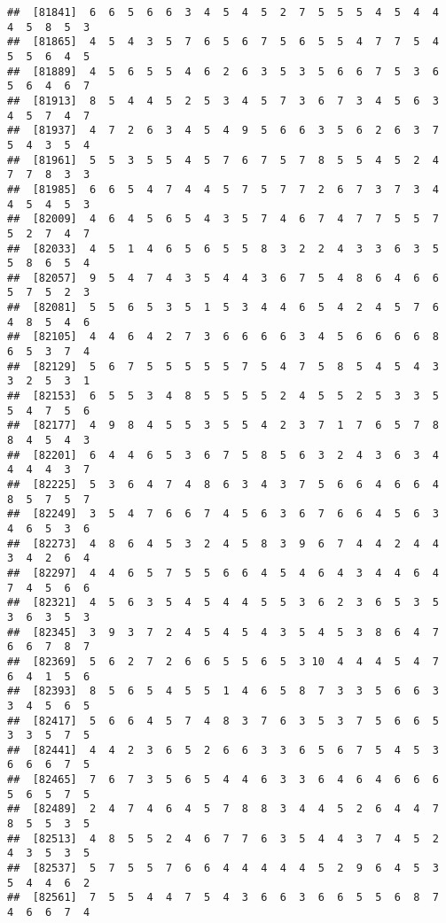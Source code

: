 \documentclass[
]{book}
\begin{document}
\begin{verbatim}
##  [81841]  6  6  5  6  6  3  4  5  4  5  2  7  5  5  5  4  5  4  4  4  5  8  5  3
##  [81865]  4  5  4  3  5  7  6  5  6  7  5  6  5  5  4  7  7  5  4  5  5  6  4  5
##  [81889]  4  5  6  5  5  4  6  2  6  3  5  3  5  6  6  7  5  3  6  5  6  4  6  7
##  [81913]  8  5  4  4  5  2  5  3  4  5  7  3  6  7  3  4  5  6  3  4  5  7  4  7
##  [81937]  4  7  2  6  3  4  5  4  9  5  6  6  3  5  6  2  6  3  7  5  4  3  5  4
##  [81961]  5  5  3  5  5  4  5  7  6  7  5  7  8  5  5  4  5  2  4  7  7  8  3  3
##  [81985]  6  6  5  4  7  4  4  5  7  5  7  7  2  6  7  3  7  3  4  4  5  4  5  3
##  [82009]  4  6  4  5  6  5  4  3  5  7  4  6  7  4  7  7  5  5  7  5  2  7  4  7
##  [82033]  4  5  1  4  6  5  6  5  5  8  3  2  2  4  3  3  6  3  5  5  8  6  5  4
##  [82057]  9  5  4  7  4  3  5  4  4  3  6  7  5  4  8  6  4  6  6  5  7  5  2  3
##  [82081]  5  5  6  5  3  5  1  5  3  4  4  6  5  4  2  4  5  7  6  4  8  5  4  6
##  [82105]  4  4  6  4  2  7  3  6  6  6  6  3  4  5  6  6  6  6  8  6  5  3  7  4
##  [82129]  5  6  7  5  5  5  5  5  7  5  4  7  5  8  5  4  5  4  3  3  2  5  3  1
##  [82153]  6  5  5  3  4  8  5  5  5  5  2  4  5  5  2  5  3  3  5  5  4  7  5  6
##  [82177]  4  9  8  4  5  5  3  5  5  4  2  3  7  1  7  6  5  7  8  8  4  5  4  3
##  [82201]  6  4  4  6  5  3  6  7  5  8  5  6  3  2  4  3  6  3  4  4  4  4  3  7
##  [82225]  5  3  6  4  7  4  8  6  3  4  3  7  5  6  6  4  6  6  4  8  5  7  5  7
##  [82249]  3  5  4  7  6  6  7  4  5  6  3  6  7  6  6  4  5  6  3  4  6  5  3  6
##  [82273]  4  8  6  4  5  3  2  4  5  8  3  9  6  7  4  4  2  4  4  3  4  2  6  4
##  [82297]  4  4  6  5  7  5  5  6  6  4  5  4  6  4  3  4  4  6  4  7  4  5  6  6
##  [82321]  4  5  6  3  5  4  5  4  4  5  5  3  6  2  3  6  5  3  5  3  6  3  5  3
##  [82345]  3  9  3  7  2  4  5  4  5  4  3  5  4  5  3  8  6  4  7  6  6  7  8  7
##  [82369]  5  6  2  7  2  6  6  5  5  6  5  3 10  4  4  4  5  4  7  6  4  1  5  6
##  [82393]  8  5  6  5  4  5  5  1  4  6  5  8  7  3  3  5  6  6  3  3  4  5  6  5
##  [82417]  5  6  6  4  5  7  4  8  3  7  6  3  5  3  7  5  6  6  5  3  3  5  7  5
##  [82441]  4  4  2  3  6  5  2  6  6  3  3  6  5  6  7  5  4  5  3  6  6  6  7  5
##  [82465]  7  6  7  3  5  6  5  4  4  6  3  3  6  4  6  4  6  6  6  5  6  5  7  5
##  [82489]  2  4  7  4  6  4  5  7  8  8  3  4  4  5  2  6  4  4  7  8  5  5  3  5
##  [82513]  4  8  5  5  2  4  6  7  7  6  3  5  4  4  3  7  4  5  2  4  3  5  3  5
##  [82537]  5  7  5  5  7  6  6  4  4  4  4  4  5  2  9  6  4  5  3  5  4  4  6  2
##  [82561]  7  5  5  4  4  7  5  4  3  6  6  3  6  6  5  5  6  8  7  4  6  6  7  4

\end{verbatim}
\end{document}
